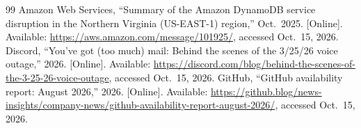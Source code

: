 \documentclass[conference]{IEEEtran}
\begin{document}
\begin{thebibliography}{99}
 Amazon Web Services, ``Summary of the Amazon DynamoDB service disruption in the Northern Virginia (US-EAST-1) region,'' Oct.\ 2025. [Online]. Available: \url{https://aws.amazon.com/message/101925/}, accessed Oct.\ 15, 2026.
 Discord, ``You've got (too much) mail: Behind the scenes of the 3/25/26 voice outage,'' 2026. [Online]. Available: \url{https://discord.com/blog/behind-the-scenes-of-the-3-25-26-voice-outage}, accessed Oct.\ 15, 2026.
 GitHub, ``GitHub availability report: August 2026,'' 2026. [Online]. Available: \url{https://github.blog/news-insights/company-news/github-availability-report-august-2026/}, accessed Oct.\ 15, 2026.
\end{thebibliography}
\end{document}
